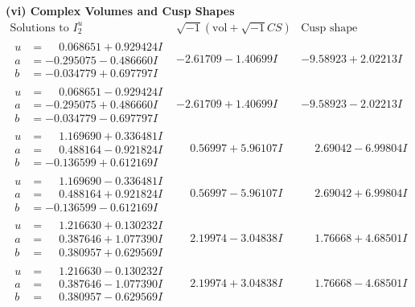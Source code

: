 \documentclass[1p]{elsarticle_modified}
\theoremstyle{definition}
\newcommand{\I}{\sqrt{-1}}
\begin{document}
\newpage\flushleft \textbf{(vi) Complex Volumes and Cusp Shapes}
$$\begin{array}{c|c|c}  
\text{Solutions to }I^u_{2}& \I (\text{vol} + \sqrt{-1}CS) & \text{Cusp shape}\\
 \hline 
\begin{aligned}
u &= \phantom{-}0.068651 + 0.929424 I \\
a &= -0.295075 - 0.486660 I \\
b &= -0.034779 + 0.697797 I\end{aligned}
 & -2.61709 - 1.40699 I & -9.58923 + 2.02213 I \\ \hline\begin{aligned}
u &= \phantom{-}0.068651 - 0.929424 I \\
a &= -0.295075 + 0.486660 I \\
b &= -0.034779 - 0.697797 I\end{aligned}
 & -2.61709 + 1.40699 I & -9.58923 - 2.02213 I \\ \hline\begin{aligned}
u &= \phantom{-}1.169690 + 0.336481 I \\
a &= \phantom{-}0.488164 - 0.921824 I \\
b &= -0.136599 + 0.612169 I\end{aligned}
 & \phantom{-}0.56997 + 5.96107 I & \phantom{-}2.69042 - 6.99804 I \\ \hline\begin{aligned}
u &= \phantom{-}1.169690 - 0.336481 I \\
a &= \phantom{-}0.488164 + 0.921824 I \\
b &= -0.136599 - 0.612169 I\end{aligned}
 & \phantom{-}0.56997 - 5.96107 I & \phantom{-}2.69042 + 6.99804 I \\ \hline\begin{aligned}
u &= \phantom{-}1.216630 + 0.130232 I \\
a &= \phantom{-}0.387646 + 1.077390 I \\
b &= \phantom{-}0.380957 + 0.629569 I\end{aligned}
 & \phantom{-}2.19974 - 3.04838 I & \phantom{-}1.76668 + 4.68501 I \\ \hline\begin{aligned}
u &= \phantom{-}1.216630 - 0.130232 I \\
a &= \phantom{-}0.387646 - 1.077390 I \\
b &= \phantom{-}0.380957 - 0.629569 I\end{aligned}
 & \phantom{-}2.19974 + 3.04838 I & \phantom{-}1.76668 - 4.68501 I \\ \hline\begin{aligned}

\end{aligned}
\end{array}$$
\end{document}
